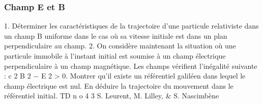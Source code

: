 \subsubsection{Champ E et B}%
1. Déterminer les caractéristiques de la trajectoire d’une particule relativiste dans un champ
B uniforme dans le cas où sa vitesse initiale est dans un plan perpendiculaire au champ.
2. On considère maintenant la situation où une particule immobile à l’instant initial est
soumise à un champ électrique perpendiculaire à un champ magnétique. Les champs
vérifient l’inégalité suivante : c 2 B 2 − E 2 > 0. Montrer qu’il existe un référentiel galiléen
dans lequel le champ électrique est nul. En déduire la trajectoire du mouvement dans le
référentiel initial.
TD n o 4
3
S. Leurent, M. Lilley, & S. Nascimbène
